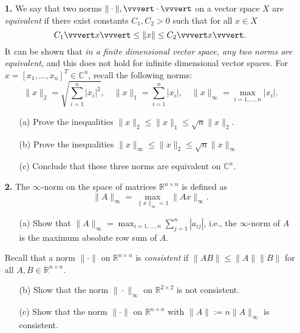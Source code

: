\documentclass[10pt]{report}
\begin{document}
\begin{enumerate}
\item[\textbf{1.}]
We say that two norms $\| \cdot \|, \vvvert \cdot \vvvert$ on a vector space $X$ are \textit{equivalent} if there exist constants $C_1, C_2 > 0$ such that for all $x \in X$
\[C_1 \vvvert x \vvvert \leq \|x\| \leq  C_2\vvvert x\vvvert.\]
It can be shown that \textit{in a finite dimensional vector space, any two norms are equivalent}, and this does not hold for infinite dimensional vector spaces. For $x =[x_1, \ldots, x_n]^T \in \mathbb{C}^{n}$, recall the following norms: 
\[
\|x\|_2 =\sqrt{\sum_{i=1}^n |x_i|^2},\quad
\|x\|_1 = \sum_{i=1}^n |x_i|,\quad
\|x\|_{\infty} = \max_{i=1, \ldots,n}|x_i|.
\]
\begin{enumerate}
  \item[(a)] Prove the inequalities $\|x\|_2 \leq \|x\|_1 \leq \sqrt{n}\|x\|_2$.
  \item[(b)]Prove the inequalities $ \|x\|_\infty \leq \|x\|_2 \leq  \sqrt{n}\|x\|_{\infty}$
\item[(c)] Conclude that these three norms are equivalent on $\mathbb{C}^n$.
\end{enumerate}
\vspace{0.3cm} 


\item[\textbf{2.}] The $\infty$-norm on the space of matrices $\mathbb{R}^{n \times n}$ is defined as
\[\|A\|_{\infty}= \max_{\|x\|_{\infty}=1} \|Ax\|_{\infty}.\]
\begin{enumerate} 
\item[(a)] Show that $\|A\|_{\infty}= \displaystyle{\max_{i=1, \ldots, n}}\sum_{j=1}^n |a_{ij}|$, i.e., the $\infty$-norm of $A$ is the maximum absolute row sum of $A$.
\end{enumerate}
Recall that a norm $\|\cdot\|$ on $\mathbb{R}^{n \times n}$ is \textit{consistent} if $\|AB\| \leq \|A\| \|B\|$ for all $A, B \in \mathbb{R}^{n \times n}$. 
\begin{enumerate} 
\item[(b)]Show that the norm $\|\cdot\|_\infty$ on $\mathbb{R}^{2 \times 2}$ is not consistent.
\item[(c)] Show that the norm $\| \cdot\|$ on $\mathbb{R}^{n \times n}$ with $\|A\|:=n \|A\|_\infty$ is consistent.
\end{enumerate}
\vspace{0.3cm} 



\end{enumerate}
\end{document}
